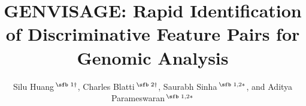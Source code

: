 \documentclass{bioinfo}
\begin{document}

\subtitle{} %

\title[Genvisage]{G{\large ENVISAGE}: Rapid Identification of Discriminative Feature Pairs for Genomic Analysis}

\author[Huang \textit{et~al}.]{Silu Huang\,$^{\text{\sfb 1}\dagger}$, Charles Blatti\,$^{\text{\sfb 2}\dagger}$, Saurabh Sinha\,$^{\text{\sfb 1,2}\ast}$, and Aditya Parameswaran\,$^{\text{\sfb 1,2}\ast}$ }


\address{$^{\text{\sf 1}}$Department of Computer Science, University of Illinois Urbana-Champaign, Urbana, IL, 61801, USA and \\
$^{\text{\sf 2}}$Institute of Genomic Biology, University of Illinois Urbana-Champaign, Urbana, IL, 61801, USA.}


\history{} %

\editor{} %
\end{document}
